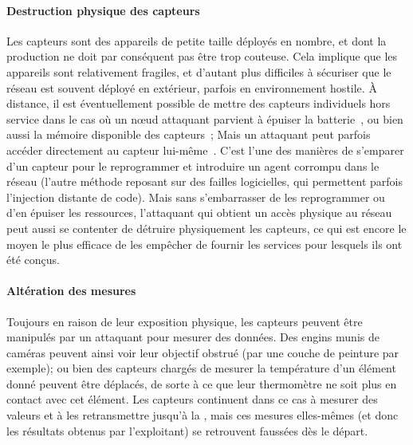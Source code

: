         \paragraph{Destruction physique des capteurs}
Les capteurs sont des appareils de petite taille déployés en nombre, et dont la production ne doit par conséquent pas être trop couteuse.
Cela implique que les appareils sont relativement fragiles, et d'autant plus difficiles à sécuriser que le réseau est souvent déployé en extérieur, parfois en environnement hostile.
À distance, il est éventuellement possible de mettre des capteurs individuels hors service dans le cas où un nœud attaquant parvient à épuiser la batterie~\cite{MS14}, ou bien aussi la mémoire disponible des capteurs~\cite{WS04};
Mais un attaquant peut parfois accéder directement au capteur lui-même~\cite{GK13}.
C'est l'une des manières de s'emparer d'un capteur pour le reprogrammer et introduire un agent corrompu dans le réseau (l'autre méthode reposant sur des failles logicielles, qui permettent parfois l'injection distante de code).
Mais sans s'embarrasser de les reprogrammer ou d'en épuiser les ressources, l'attaquant qui obtient un accès physique au réseau peut aussi se contenter de détruire physiquement les capteurs, ce qui est encore le moyen le plus efficace de les empêcher de fournir les services pour lesquels ils ont été conçus.

        \paragraph{Altération des mesures}
Toujours en raison de leur exposition physique, les capteurs peuvent être manipulés par un attaquant pour mesurer des données.
Des engins munis de caméras peuvent ainsi voir leur objectif obstrué (par une couche de peinture par exemple); ou bien des capteurs chargés de mesurer la température d'un élément donné peuvent être déplacés, de sorte à ce que leur thermomètre ne soit plus en contact avec cet élément.
Les capteurs continuent dans ce cas à mesurer des valeurs et à les retransmettre jusqu'à la \sdb, mais ces mesures elles-mêmes (et donc les résultats obtenus par l'exploitant) se retrouvent faussées dès le départ.

